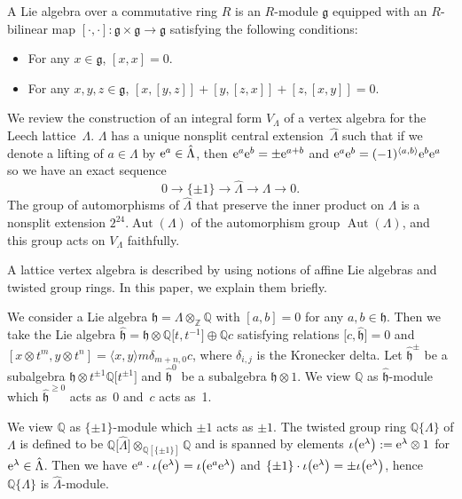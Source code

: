 \documentclass[10pt,a4paper]{amsart}
\numberwithin{equation}{section}
\begin{document}
\begin{Definition}
A Lie algebra over a commutative ring $R$ is an $R$-module $\mathfrak{g}$ equipped with an $R$-bilinear map $[\cdot,\cdot]\colon \mathfrak{g}\times\mathfrak{g}\rightarrow \mathfrak{g}$ satisfying the following conditions:
 \begin{itemize}\itemsep=0pt
 \item For any $x \in \mathfrak{g}$, $[x,x]=0$.
 \item For any $x,y,z \in \mathfrak{g}$, $[x,[y,z]]+[y,[z,x]]+[z,[x,y]]=0$.
 \end{itemize}
\end{Definition}

 We review the construction of an integral form $V_\Lambda$ of a vertex algebra for the Leech lattice~$\Lambda$.
$\Lambda$ has a unique nonsplit central extension~$\hat{\Lambda}$ such that if we denote a lifting of $a \in \Lambda$ by ${\rm e}^a\in \hat{\Lambda}$, then ${\rm e}^a{\rm e}^b=\pm {\rm e}^{a+b}$ and ${\rm e}^a{\rm e}^b=(-1)^{\langle a,b\rangle}{\rm e}^b{\rm e}^a$ so we have an exact sequence
\[
0\rightarrow \{\pm1\}\rightarrow \hat{\Lambda}\rightarrow \Lambda \rightarrow 0.
\]
The group of automorphisms of $\hat{\Lambda}$ that preserve the inner product on $\Lambda$ is a nonsplit extension $2^{24}.\operatorname{Aut}(\Lambda)$ of the automorphism group $\operatorname{Aut}(\Lambda)$, and this group acts on $V_{\Lambda}$ faithfully.

A lattice vertex algebra is described by using notions of affine Lie algebras and twisted group rings. In this paper, we explain them briefly.

We consider a Lie algebra $\mathfrak{h}=\Lambda\otimes_\mathbb{Z}\mathbb{Q}$ with $[a,b]=0$ for any $a,b\in \mathfrak{h}$. Then we take the Lie algebra $\hat{\mathfrak{h}}=\mathfrak{h}\otimes \mathbb{Q}\big[t,t^{-1}\big]\oplus \mathbb{Q}c$ satisfying relations $\big[c,\hat{\mathfrak{h}}\big]=0$ and $[x\otimes t^m, y\otimes t^n]=\langle x,y \rangle m\delta_{m+n,0}c$, where $\delta_{i,j}$ is the Kronecker delta.
Let $\hat{\mathfrak{h}}^{\pm}$ be a subalgebra $\mathfrak{h}\otimes t^{\pm1}\mathbb{Q}\big[t^{\pm1}\big]$ and $\hat{\mathfrak{h}}^0$ be a subalgebra $\mathfrak{h}\otimes 1$. We view $\mathbb{Q}$ as $\hat{\mathfrak{h}}$-module which $\hat{\mathfrak{h}}^{\geq 0}$ acts as~0 and~$c$ acts as~1.

We view $\mathbb{Q}$ as $\{\pm1\}$-module which $\pm1$ acts as $\pm1$. The twisted group ring $\mathbb{Q}\{\Lambda \}$ of $\Lambda$ is defined to be $\mathbb{Q}\big[\hat{\Lambda}\big]\otimes_{\mathbb{Q}[\{ \pm 1\}]}\mathbb{Q}$ and is spanned by elements $\iota \big({\rm e}^\lambda\big):={\rm e}^\lambda \otimes 1$ for ${\rm e}^\lambda \in \hat{\Lambda}$. Then we have ${\rm e}^a\cdot\iota\big({\rm e}^\lambda\big)=\iota\big({\rm e}^a{\rm e}^\lambda\big)$ and $\{\pm1\}\cdot\iota\big({\rm e}^\lambda\big)=\pm\iota\big({\rm e}^\lambda\big)$, hence $\mathbb{Q}\{\Lambda \}$ is $\hat{\Lambda}$-module.
\end{document}
